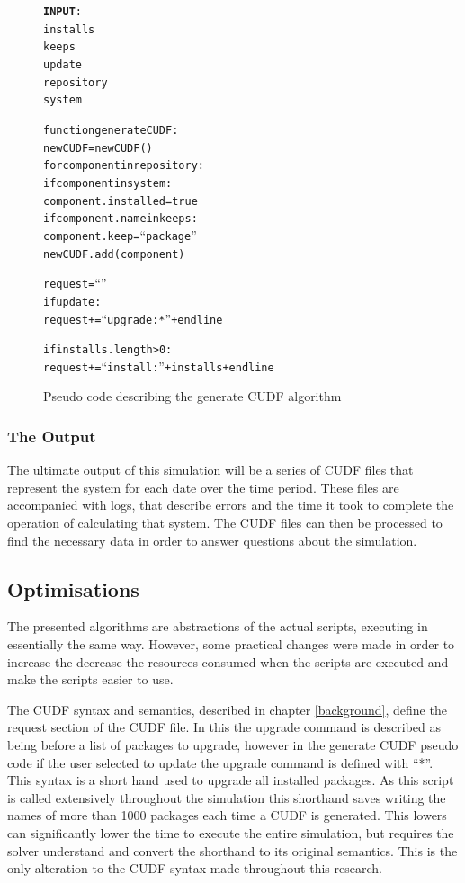 \begin{figure}[htp]
\begin{center}
\begin{alltt}
\textbf{INPUT}:
installs
keeps
update
repository
system


function generateCUDF:
    newCUDF = new CUDF()
    for component in repository:
        if component in system:
            component.installed = true
            if component.name in keeps:
                component.keep = ``package''
        newCUDF.add(component)
    
    request = ``''
    if update:
        request += ``upgrade: *'' + endline
        
    if installs.length > 0:
        request += ``install: ''  + installs + endline
    
\end{alltt}
\caption[Generate CUDF Pseudo Code]{Pseudo code describing the generate CUDF algorithm}
\label{generateCUDF}
\end{center}
\end{figure}


\subsubsection{The Output}
The ultimate output of this simulation will be a series of CUDF files that represent the system for each date over the time period.
These files are accompanied with logs, that describe errors and the time it took to complete the operation of calculating that system.
The CUDF files can then be processed to find the necessary data in order to answer questions about the simulation.

\subsection{Optimisations}
The presented algorithms are abstractions of the actual scripts, executing in essentially the same way. 
However, some practical changes were made in order to increase the decrease the resources consumed when the scripts are executed and make the scripts easier to use.

The CUDF syntax and semantics, described in chapter \ref{background}, define the request section of the CUDF file.
In this the upgrade command is described as being before a list of packages to upgrade,
however in the generate CUDF pseudo code if the user selected to update the upgrade command is defined with ``*''.
This syntax is a short hand used to upgrade all installed packages.
As this script is called extensively throughout the simulation this shorthand saves writing the names of more than 1000 packages each time a CUDF is generated.
This lowers can significantly lower the time to execute the entire simulation, but requires the solver understand and convert the shorthand to its original semantics.
This is the only alteration to the CUDF syntax made throughout this research.


